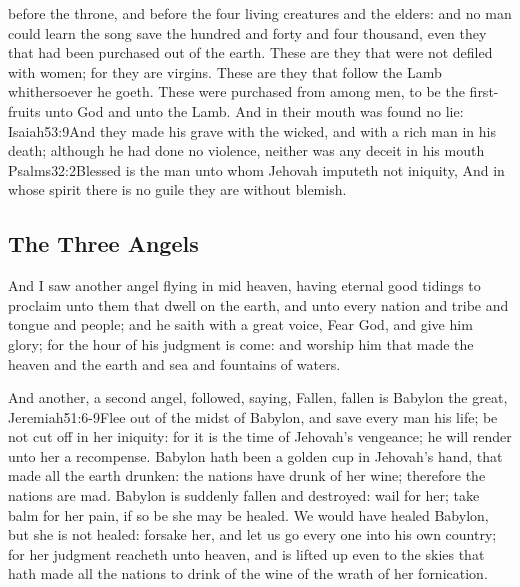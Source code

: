 before the throne, and before the four living creatures and the elders: and no man could learn the song save the hundred and forty and four thousand, even they that had been purchased out of the earth. 
These are they that were not defiled with women; for they are virgins. These are they that follow the Lamb whithersoever he goeth. These were purchased from among men, to be the first-fruits unto God and unto the Lamb. 
And in their mouth was found no lie:%
				   {Isaiah}{53:9}{And they made his grave with the wicked, and with a rich man in his death; although he had done no violence, neither was any deceit in his mouth}%
				   {Psalms}{32:2}{Blessed is the man unto whom Jehovah imputeth not iniquity,
And in whose spirit there is no guile}
 they are without blemish.
\subsection*{The Three Angels}
And I saw another angel flying in mid heaven, having eternal good tidings to proclaim unto them that dwell on the earth, and unto every nation and tribe and tongue and people; 
and he saith with a great voice, Fear God, and give him glory; for the hour of his judgment is come: and worship him that made the heaven and the earth and sea and fountains of waters.

And another, a second angel, followed, saying, Fallen, fallen is Babylon the great,%
				  {Jeremiah}{51:6-9}{Flee out of the midst of Babylon, and save every man his life; be not cut off in her iniquity: for it is the time of Jehovah’s vengeance; he will render unto her a recompense. Babylon hath been a golden cup in Jehovah’s hand, that made all the earth drunken: the nations have drunk of her wine; therefore the nations are mad. Babylon is suddenly fallen and destroyed: wail for her; take balm for her pain, if so be she may be healed. We would have healed Babylon, but she is not healed: forsake her, and let us go every one into his own country; for her judgment reacheth unto heaven, and is lifted up even to the skies}
 that hath made all the nations to drink of the wine of the wrath of her fornication.

